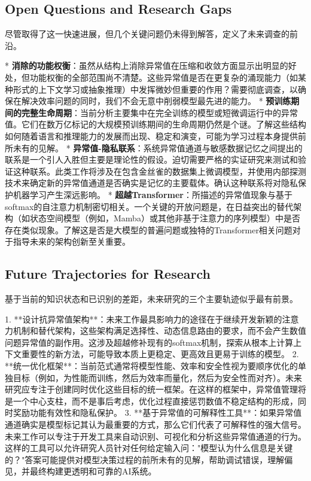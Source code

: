 \documentclass{article}
\begin{document}
\subsection{Open Questions and Research Gaps}

尽管取得了这一快速进展，但几个关键问题仍未得到解答，定义了未来调查的前沿。

* \textbf{消除的功能权衡}：虽然从结构上消除异常值在压缩和收敛方面显示出明显的好处，但功能权衡的全部范围尚不清楚。这些异常值是否在更复杂的涌现能力（如某种形式的上下文学习或抽象推理）中发挥微妙但重要的作用？需要彻底调查，以确保在解决效率问题的同时，我们不会无意中削弱模型最先进的能力。
* \textbf{预训练期间的完整生命周期}：当前分析主要集中在完全训练的模型或短微调运行中的异常值。它们在数万亿标记的大规模预训练期间的生命周期仍然是个谜。了解这些结构如何随着语言和推理能力的发展而出现、稳定和演变，可能为学习过程本身提供前所未有的见解。
* \textbf{异常值-隐私联系}：系统异常值通道与敏感数据记忆之间提出的联系是一个引人入胜但主要是理论性的假设。迫切需要严格的实证研究来测试和验证这种联系。此类工作将涉及在包含金丝雀的数据集上微调模型，并使用内部探测技术来确定新的异常值通道是否确实是记忆的主要载体。确认这种联系将对隐私保护机器学习产生深远影响。
* \textbf{超越Transformer}：所描述的异常值现象与基于softmax的自注意力机制密切相关。一个关键的开放问题是，在日益突出的替代架构（如状态空间模型（例如，Mamba）或其他非基于注意力的序列模型）中是否存在类似现象。了解这是否是大模型的普遍问题或独特的Transformer相关问题对于指导未来的架构创新至关重要。

\subsection{Future Trajectories for Research}

基于当前的知识状态和已识别的差距，未来研究的三个主要轨迹似乎最有前景。

1. **设计抗异常值架构**：未来工作最具影响力的途径在于继续开发新颖的注意力机制和替代架构，这些架构满足选择性、动态信息路由的要求，而不会产生数值问题异常值的副作用。这涉及超越修补现有的softmax机制，探索从根本上计算上下文重要性的新方法，可能导致本质上更稳定、更高效且更易于训练的模型。
2. **统一优化框架**：当前范式通常将模型性能、效率和安全性视为要顺序优化的单独目标（例如，为性能而训练，然后为效率而量化，然后为安全性而对齐）。未来研究应专注于创建同时优化这些目标的统一框架。在这样的框架中，异常值管理将是一个中心支柱，而不是事后考虑，优化过程直接惩罚数值不稳定结构的形成，同时奖励功能有效性和隐私保护。
3. **基于异常值的可解释性工具**：如果异常值通道确实是模型标记其认为最重要的方式，那么它们代表了可解释性的强大信号。未来工作可以专注于开发工具来自动识别、可视化和分析这些异常值通道的行为。这样的工具可以允许研究人员针对任何给定输入问："模型认为什么信息是关键的？"答案可能提供对模型决策过程的前所未有的见解，帮助调试错误，理解偏见，并最终构建更透明和可靠的AI系统。



\end{document}
